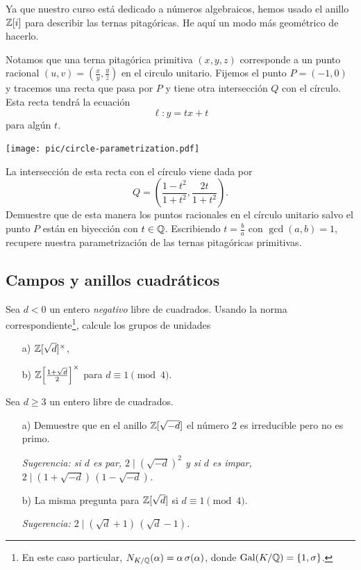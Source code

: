 \begin{ejercicio}
  Ya que nuestro curso está dedicado a números algebraicos, hemos usado el
  anillo $\mathbb{Z} [i]$ para describir las ternas pitagóricas. He aquí un modo más
  geométrico de hacerlo.

  Notamos que una terna pitagórica primitiva $(x,y,z)$ corresponde a un punto
  racional $(u,v) = \left(\frac{x}{y}, \frac{y}{z}\right)$ en el circulo
  unitario. Fijemos el punto $P = (-1,0)$ y tracemos una recta que pasa por $P$
  y tiene otra intersección $Q$ con el círculo. Esta recta tendrá la ecuación
  $$\ell\colon y = tx + t$$
  para algún $t$.

  \begin{center}
    \texttt{[image: pic/circle-parametrization.pdf]}
  \end{center}

  La intersección de esta recta con el círculo viene dada por
  $$Q = \left(\frac{1 - t^2}{1 + t^2}, \frac{2t}{1 + t^2}\right).$$ Demuestre
  que de esta manera los puntos racionales en el círculo unitario salvo el punto
  $P$ están en biyección con $t \in \mathbb{Q}$. Escribiendo $t = \frac{b}{a}$ con
  $\gcd (a,b) = 1$, recupere nuestra parametrización de las ternas pitagóricas
  primitivas.
\end{ejercicio}

\subsection*{Campos y anillos cuadráticos}

\begin{ejercicio}
  Sea $d < 0$ un entero \emph{negativo} libre de cuadrados. Usando la norma
  correspondiente\footnote{En este caso particular,
    $N_{K/\mathbb{Q}} (\alpha) = \alpha\,\sigma (\alpha)$,
    donde $\operatorname{Gal} (K/\mathbb{Q}) = \{ 1, \sigma \}$.},
  calcule los grupos de unidades

  \begin{enumerate}
  \item[a)] $\mathbb{Z} [\sqrt{d}]^\times$,
  \item[b)] $\mathbb{Z} \Bigl[\frac{1+\sqrt{d}}{2}\Bigr]^\times$ para
    $d \equiv 1 \pmod{4}$.
  \end{enumerate}
\end{ejercicio}

\begin{ejercicio}
  Sea $d \ge 3$ un entero libre de cuadrados.

  \begin{enumerate}
    \item[a)] Demuestre que en el anillo $\mathbb{Z} [\sqrt{-d}]$ el número $2$ es
      irreducible pero no es primo.

      \emph{Sugerencia: si $d$ es par, $2 \mid (\sqrt{-d})^2$ y si $d$ es impar,
      $2 \mid (1 + \sqrt{-d})\,(1 - \sqrt{-d})$.}

    \item[b)] La misma pregunta para $\mathbb{Z} [\sqrt{d}]$ si $d \equiv 1 \pmod{4}$.

      \emph{Sugerencia: $2 \mid (\sqrt{d} + 1)\,(\sqrt{d} - 1)$.}
  \end{enumerate}
\end{ejercicio}

